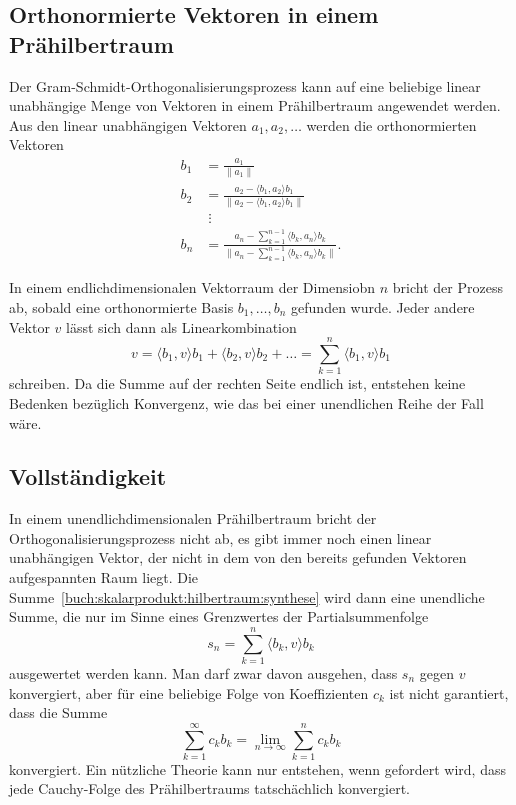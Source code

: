 \subsection{Orthonormierte Vektoren in einem Prähilbertraum}
Der Gram-Schmidt-Orthogonalisierungsprozess kann auf eine beliebige
%
linear unabhängige Menge von Vektoren in einem Prähilbertraum angewendet
werden.
Aus den linear unabhängigen Vektoren $a_1,a_2,\dots$ werden die
orthonormierten Vektoren
\begin{align*}
b_1
&=
\frac{a_1}{\|a_1\|}
\\
b_2
&=
\frac{
a_2 - \langle b_1,a_2\rangle b_1
}{
\|a_2 - \langle b_1,a_2\rangle b_1\|
}
\\
&\;\vdots
\\
b_n
&=
\frac{\displaystyle
a_n - \sum_{k=1}^{n-1} \langle b_k,a_n\rangle b_k
}{\displaystyle
\biggl\|a_n - \sum_{k=1}^{n-1} \langle b_k,a_n\rangle b_k\biggr\|
}.
\end{align*}

In einem endlichdimensionalen Vektorraum der Dimensiobn $n$ bricht
der Prozess ab, sobald eine orthonormierte Basis $b_1,\dots,b_n$
gefunden wurde.
Jeder andere Vektor $v$ lässt sich dann als Linearkombination
\begin{equation}
v
=
\langle b_1,v\rangle b_1 + \langle b_2,v\rangle b_2 + \dots
=
\sum_{k=1}^n \langle b_1,v\rangle b_1
\label{buch:skalarprodukt:hilbertraum:synthese}
\end{equation}
schreiben.
Da die Summe auf der rechten Seite endlich ist, entstehen keine
Bedenken bezüglich Konvergenz, wie das bei einer unendlichen
Reihe der Fall wäre.

%
%
\subsection{Vollständigkeit}
In einem unendlichdimensionalen Prähilbertraum bricht der
Orthogonalisierungsprozess nicht ab, es gibt immer noch einen
linear unabhängigen Vektor, der nicht in dem von den bereits
gefunden Vektoren aufgespannten Raum liegt.
Die Summe~\ref{buch:skalarprodukt:hilbertraum:synthese} wird dann
eine unendliche Summe, die nur im Sinne eines Grenzwertes der
Partialsummenfolge
\[
s_n = \sum_{k=1}^n \langle b_k,v\rangle b_k
\]
ausgewertet werden kann.
Man darf zwar davon ausgehen, dass $s_n$ gegen $v$ konvergiert,
aber für eine beliebige Folge von Koeffizienten $c_k$ ist nicht
garantiert, dass die Summe
\[
\sum_{k=1}^\infty c_kb_k
=
\lim_{n\to\infty} \sum_{k=1}^n c_kb_k
\]
konvergiert.
Ein nützliche Theorie kann nur entstehen, wenn gefordert wird,
dass jede Cauchy-Folge des Prähilbertraums tatschächlich konvergiert.


